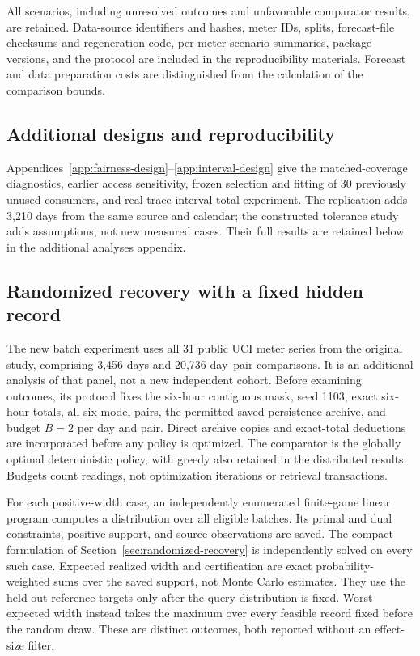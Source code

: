 \documentclass[12pt]{article}
\begin{document}
All scenarios, including unresolved outcomes and unfavorable comparator
results, are retained. Data-source identifiers and hashes, meter IDs, splits,
forecast-file checksums and regeneration code, per-meter scenario summaries,
package versions, and the
protocol are included in the reproducibility materials. Forecast and data
preparation costs are distinguished from the calculation of the comparison
bounds.



\subsection{Additional designs and reproducibility}
Appendices~\ref{app:fairness-design}--\ref{app:interval-design} give the
matched-coverage diagnostics, earlier access sensitivity, frozen selection
and fitting of 30 previously unused consumers, and real-trace interval-total
experiment. The replication adds 3,210 days from the same source and calendar;
the constructed tolerance study adds assumptions, not new measured cases.
Their full results are retained below in the additional analyses appendix.

\subsection{Randomized recovery with a fixed hidden record}\label{sec:random-design}
The new batch experiment uses all 31 public UCI meter series from the
original study, comprising 3,456 days and 20,736 day--pair comparisons.
It is an additional analysis of that panel, not a new independent cohort.
Before examining outcomes, its protocol fixes the six-hour contiguous mask,
seed 1103, exact six-hour totals, all six model pairs, the permitted saved
persistence archive, and budget $B=2$ per day and pair. Direct archive
copies and exact-total deductions are incorporated before any policy is
optimized. The comparator is the globally optimal deterministic policy,
with greedy also retained in the distributed results. Budgets count
readings, not optimization iterations or retrieval transactions.

For each positive-width case, an independently enumerated finite-game
linear program computes a distribution over all eligible batches. Its
primal and dual constraints, positive support, and source observations
are saved. The compact formulation of Section~\ref{sec:randomized-recovery}
is independently solved on every such case. Expected realized width and
certification are exact probability-weighted sums over the saved support,
not Monte Carlo estimates. They use the held-out reference targets only
after the query distribution is fixed. Worst expected width instead takes
the maximum over every feasible record fixed before the random draw.
These are distinct outcomes, both reported without an effect-size filter.
\end{document}
